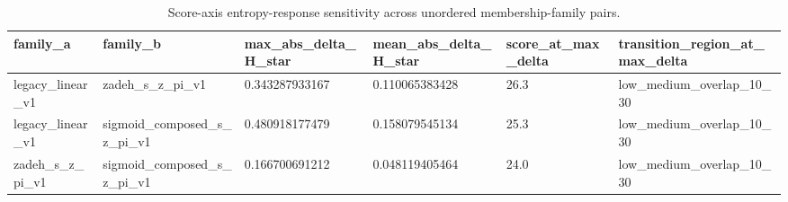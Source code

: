 \begin{table}[t]
\centering
\caption{Score-axis entropy-response sensitivity across unordered membership-family pairs.}
\label{tab:fss\_family\_sensitivity\_matrix}
\begin{tabular}{llllll}
\hline
family\_a & family\_b & max\_abs\_delta\_H\_star & mean\_abs\_delta\_H\_star & score\_at\_max\_delta & transition\_region\_at\_max\_delta \\
\hline
legacy\_linear\_v1 & zadeh\_s\_z\_pi\_v1 & 0.343287933167 & 0.110065383428 & 26.3 & low\_medium\_overlap\_10\_30 \\
legacy\_linear\_v1 & sigmoid\_composed\_s\_z\_pi\_v1 & 0.480918177479 & 0.158079545134 & 25.3 & low\_medium\_overlap\_10\_30 \\
zadeh\_s\_z\_pi\_v1 & sigmoid\_composed\_s\_z\_pi\_v1 & 0.166700691212 & 0.048119405464 & 24.0 & low\_medium\_overlap\_10\_30 \\
\hline
\end{tabular}
\end{table}
